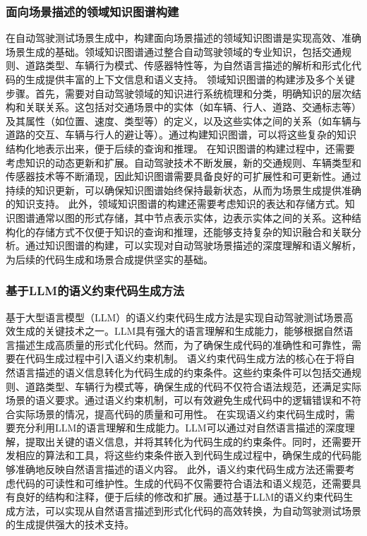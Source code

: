 \documentclass{article}
\begin{document}
\subsubsection{面向场景描述的领域知识图谱构建}
在自动驾驶测试场景生成中，构建面向场景描述的领域知识图谱是实现高效、准确场景生成的基础。领域知识图谱通过整合自动驾驶领域的专业知识，包括交通规则、道路类型、车辆行为模式、传感器特性等，为自然语言描述的解析和形式化代码的生成提供丰富的上下文信息和语义支持。
领域知识图谱的构建涉及多个关键步骤。首先，需要对自动驾驶领域的知识进行系统梳理和分类，明确知识的层次结构和关联关系。这包括对交通场景中的实体（如车辆、行人、道路、交通标志等）及其属性（如位置、速度、类型等）的定义，以及这些实体之间的关系（如车辆与道路的交互、车辆与行人的避让等）。通过构建知识图谱，可以将这些复杂的知识结构化地表示出来，便于后续的查询和推理。
在知识图谱的构建过程中，还需要考虑知识的动态更新和扩展。自动驾驶技术不断发展，新的交通规则、车辆类型和传感器技术等不断涌现，因此知识图谱需要具备良好的可扩展性和可更新性。通过持续的知识更新，可以确保知识图谱始终保持最新状态，从而为场景生成提供准确的知识支持。
此外，领域知识图谱的构建还需要考虑知识的表达和存储方式。知识图谱通常以图的形式存储，其中节点表示实体，边表示实体之间的关系。这种结构化的存储方式不仅便于知识的查询和推理，还能够支持复杂的知识融合和关联分析。通过知识图谱的构建，可以实现对自动驾驶场景描述的深度理解和语义解析，为后续的代码生成和场景合成提供坚实的基础。

\subsubsection{基于LLM的语义约束代码生成方法}
基于大型语言模型（LLM）的语义约束代码生成方法是实现自动驾驶测试场景高效生成的关键技术之一。LLM具有强大的语言理解和生成能力，能够根据自然语言描述生成高质量的形式化代码。然而，为了确保生成代码的准确性和可靠性，需要在代码生成过程中引入语义约束机制。
语义约束代码生成方法的核心在于将自然语言描述的语义信息转化为代码生成的约束条件。这些约束条件可以包括交通规则、道路类型、车辆行为模式等，确保生成的代码不仅符合语法规范，还满足实际场景的语义要求。通过语义约束机制，可以有效避免生成代码中的逻辑错误和不符合实际场景的情况，提高代码的质量和可用性。
在实现语义约束代码生成时，需要充分利用LLM的语言理解和生成能力。LLM可以通过对自然语言描述的深度理解，提取出关键的语义信息，并将其转化为代码生成的约束条件。同时，还需要开发相应的算法和工具，将这些约束条件嵌入到代码生成过程中，确保生成的代码能够准确地反映自然语言描述的语义内容。
此外，语义约束代码生成方法还需要考虑代码的可读性和可维护性。生成的代码不仅需要符合语法和语义规范，还需要具有良好的结构和注释，便于后续的修改和扩展。通过基于LLM的语义约束代码生成方法，可以实现从自然语言描述到形式化代码的高效转换，为自动驾驶测试场景的生成提供强大的技术支持。
\end{document}
